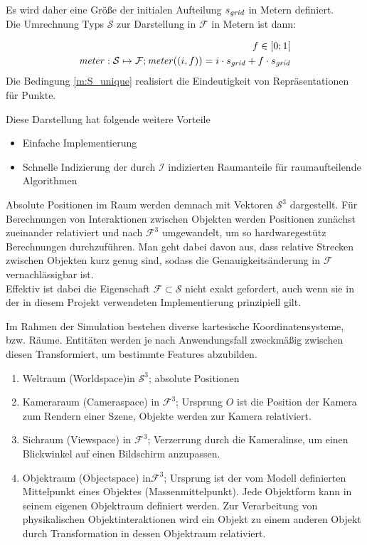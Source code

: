 Es wird daher eine Größe der initialen Aufteilung $s_{\mathit{grid}}$ in Metern definiert.\\
Die Umrechnung Typs $\mathcal{S}$ zur Darstellung in $\mathcal{F}$ in Metern ist dann:

\begin{align}
	f \in [0;1[ \label{m:S_unique} \\
	\mathit{meter}: \mathcal{S} \mapsto \mathcal{F};  \mathit{meter}((i, f)) = i \cdot s_{\mathit{grid}} + f \cdot s_{\mathit{grid}}
\end{align}
Die Bedingung \ref{m:S_unique} realisiert die Eindeutigkeit von Repräsentationen für Punkte.

Diese Darstellung hat folgende weitere Vorteile
\begin{itemize}
\item Einfache Implementierung
\item Schnelle Indizierung der durch $\mathcal{I}$ indizierten Raumanteile für raumaufteilende Algorithmen
\end{itemize}

Absolute Positionen im Raum werden demnach mit Vektoren $\mathcal{S}^3$ dargestellt. Für Berechnungen von Interaktionen zwischen Objekten werden Positionen zunächst zueinander relativiert und nach $\mathcal{F}^3$ umgewandelt, um so hardwaregestütz Berechnungen durchzuführen. 
Man geht dabei davon aus, dass relative Strecken zwischen Objekten kurz genug sind, sodass die Genauigkeitsänderung in $\mathcal{F}$ vernachlässigbar ist.\\
Effektiv ist dabei die Eigenschaft $\mathcal{F}\subset\mathcal{S}$ nicht exakt gefordert, auch wenn sie in der in diesem Projekt verwendeten Implementierung prinzipiell gilt.

Im Rahmen der Simulation bestehen diverse kartesische Koordinatensysteme, bzw. Räume. Entitäten werden je nach Anwendungsfall zweckmäßig zwischen diesen Transformiert, um bestimmte Features abzubilden.

\begin{enumerate}
\item Weltraum (Worldspace)in $\mathcal{S}^3$; absolute Positionen
\item Kameraraum (Cameraspace) in $\mathcal{F}^3$; Ursprung $O$ ist die Position der Kamera zum Rendern einer Szene, Objekte werden zur Kamera relativiert.
\item Sichraum (Viewspace) in $\mathcal{F}^3$; Verzerrung durch die Kameralinse, um einen Blickwinkel auf einen Bildschirm anzupassen.
\item Objektraum (Objectspace) in$\mathcal{F}^3$; Ursprung ist der vom Modell definierten Mittelpunkt eines Objektes (Massenmittelpunkt). Jede Objektform kann in seinem eigenen Objektraum definiert werden. Zur Verarbeitung von physikalischen Objektinteraktionen wird ein Objekt zu einem anderen Objekt durch Transformation in dessen Objektraum relativiert.
\end{enumerate}

